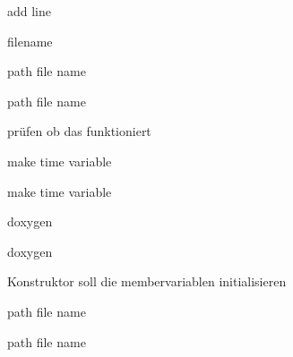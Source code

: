 \begin{DoxyRefList}
\label{todo__todo000021}%
%
add line 

\label{todo__todo000020}%
%
filename  
\item[Member \doxylink{class_socket_client_a817a64f6a66db3b347dc885edfe88c92}{Socket\+Client\+::Save\+Numeric\+Value\+List\+Consolidated\+CSV} ()]\label{todo__todo000017}%
%
path file name  
\item[Member \doxylink{class_socket_client_aa0b6d1f9400f9c844df189a23156c079}{Socket\+Client\+::Save\+Numeric\+Value\+List\+Rows} ()]\label{todo__todo000019}%
%
path file name  
\item[Member \doxylink{class_socket_client_a4d7263d3b373ca4535cd0ebd8404c69e}{Socket\+Client\+::send\+Bytes} (std\+::vector$<$ std\+::byte $>$ bytes)]\label{todo__todo000004}%
%
prüfen ob das funktioniert  
\item[Member \doxylink{class_socket_client_a0e1a7c44072c870915d746872492a542}{Socket\+Client\+::Send\+Cycled\+Extended\+Poll\+Data\+Request} (size\+\_\+t n\+Interval)]\label{todo__todo000038}%
%
make time variable  
\item[Member \doxylink{class_socket_client_a4f28ce2bad93e3a3cc34edaf4b815d10}{Socket\+Client\+::Send\+Cycled\+Extended\+Poll\+Wave\+Data\+Request} (size\+\_\+t n\+Interval)]\label{todo__todo000039}%
%
make time variable  
\item[Member \doxylink{class_socket_client_a273f71de35f9605380fa9a6fb3d3220d}{Socket\+Client\+::Send\+RTSAPriority\+Message} (std\+::vector$<$ std\+::byte $>$ Wave\+Tr\+Type)]\label{todo__todo000042}%
%
doxygen  
\item[Member \doxylink{class_socket_client_ac11bd5de6f5950c8d76df508df5ecbe0}{Socket\+Client\+::Set\+RTSAPriority\+List} (size\+\_\+t n\+Wave\+Set\+Type)]\label{todo__todo000043}%
%
doxygen  
\item[Member \doxylink{class_socket_client_a8dea390b6a95c2a63848a628fda9b962}{Socket\+Client\+::Socket\+Client} (std\+::string remote\+IPtarget, const unsigned short remote\+Port\+Target)]\label{todo__todo000003}%
%
Konstruktor soll die membervariablen initialisieren  
\item[Member \doxylink{class_socket_client_a6e1541bf075b3b64031dc534c28339af}{Socket\+Client\+::Write\+Numeric\+Headers\+List} ()]\label{todo__todo000018}%
%
path file name  
\item[Member \doxylink{class_socket_client_a54a9fe05c2e57daf8d46bb183cc2c0a8}{Socket\+Client\+::Write\+Numeric\+Headers\+List\+Consolidated\+CSV} ()]\label{todo__todo000016}%
%
path file name 
\end{DoxyRefList}